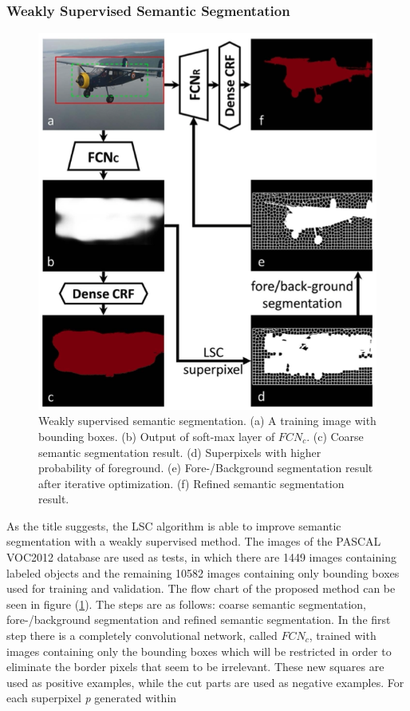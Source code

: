 \subsubsection{Weakly Supervised Semantic Segmentation}
\begin{figure}[h!]
    \centering
    \includegraphics[width = 0.6 \linewidth]{images/paper2/semanticSegmentation.png}
    \centering
    \caption{Weakly supervised semantic segmentation. (a) A training image with bounding boxes. (b) Output of soft-max layer of $ FCN_c $. (c) Coarse semantic segmentation result. (d) Superpixels with higher probability of foreground. (e) Fore-/Background segmentation result after iterative optimization. (f) Refined semantic segmentation result.}
    \label{fig: flowchartSemanticSegmentation}
\end{figure}
As the title suggests, the LSC algorithm is able to improve semantic segmentation 
with a weakly supervised method. The images of the PASCAL 
VOC2012 database \cite{0781426538} are used as tests, in which there are 1449 images
containing labeled objects and the remaining 10582 images containing only 
bounding boxes used for training and validation. The flow chart of the proposed 
method can be seen in figure (\ref{fig: flowchartSemanticSegmentation}). The steps are as follows: coarse 
semantic segmentation, fore-/background segmentation and refined semantic 
segmentation. In the first step there is a completely convolutional network, 
called $ FCN_c $, trained with images containing only the bounding boxes which 
will be restricted in order to eliminate the border pixels that seem to be 
irrelevant. These new squares are used as positive examples, while the cut 
parts are used as negative examples. For each superpixel \emph{p} generated within 
